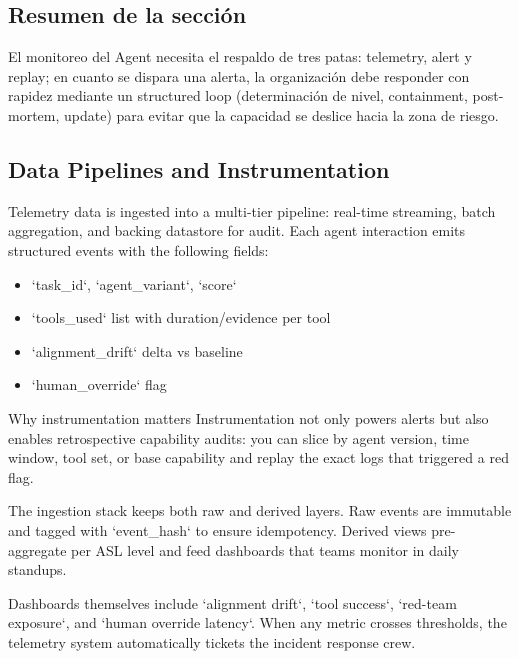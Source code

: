 \subsection{Resumen de la sección}

El monitoreo del Agent necesita el respaldo de tres patas: telemetry, alert y replay; en cuanto se dispara una alerta, la organización debe responder con rapidez mediante un structured loop (determinación de nivel, containment, post-mortem, update) para evitar que la capacidad se deslice hacia la zona de riesgo.

\subsection{Data Pipelines and Instrumentation}

Telemetry data is ingested into a multi-tier pipeline: real-time streaming, batch aggregation, and backing datastore for audit. Each agent interaction emits structured events with the following fields:

\begin{itemize}
    \item `task\_id`, `agent\_variant`, `score`
    \item `tools\_used` list with duration/evidence per tool
    \item `alignment\_drift` delta vs baseline
    \item `human\_override` flag
\end{itemize}

\begin{importantbox}{Why instrumentation matters}
Instrumentation not only powers alerts but also enables retrospective capability audits: you can slice by agent version, time window, tool set, or base capability and replay the exact logs that triggered a red flag.
\end{importantbox}

The ingestion stack keeps both raw and derived layers. Raw events are immutable and tagged with `event\_hash` to ensure idempotency. Derived views pre-aggregate per ASL level and feed dashboards that teams monitor in daily standups.

Dashboards themselves include `alignment drift`, `tool success`, `red-team exposure`, and `human override latency`. When any metric crosses thresholds, the telemetry system automatically tickets the incident response crew.

